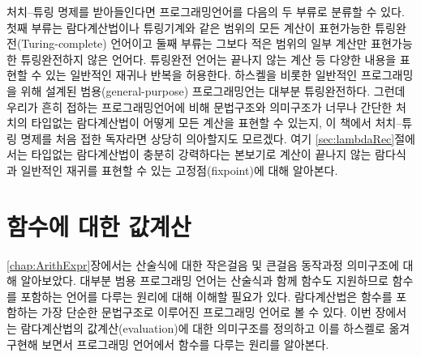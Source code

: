 처치--튜링 명제를 받아들인다면 프로그래밍언어를 다음의 두 부류로 분류할 수 있다.
첫째 부류는 람다계산법이나 튜링기계와 같은 범위의 모든 계산이 표현가능한 
튜링완전(Turing-complete) 언어이고 둘째 부류는 그보다 적은 범위의 일부 계산만
표현가능한 튜링완전하지 않은 언어다. 튜링완전 언어는 끝나지 않는 계산 등
다양한 내용을 표현할 수 있는 일반적인 재귀나 반복을 허용한다. 하스켈을 비롯한
일반적인 프로그래밍을 위해 설계된 범용(general-purpose) 프로그래밍언는 대부분
튜링완전하다. 그런데 우리가 흔히 접하는 프로그래밍언어에 비해 문법구조와
의미구조가 너무나 간단한 처치의 타입없는 람다계산법이 어떻게 모든 계산을
표현할 수 있는지, 이 책에서 처치--튜링 명제를 처음 접한 독자라면 상당히
의아할지도 모르겠다. 여기 \ref{sec:lambdaRec}절에서는 타입없는 람다계산법이 충분히 강력하다는
본보기로 계산이 끝나지 않는 람다식과 일반적인 재귀를 표현할 수 있는
고정점(fixpoint)에 대해 알아본다.




\chapter{함수에 대한 값계산}
\label{chap:FunEval}
\ref{chap:ArithExpr}장에서는 산술식에 대한 작은걸음 및 큰걸음
동작과정 의미구조에 대해 알아보았다. 대부분 범용 프로그래밍 언어는
산술식과 함께 함수도 지원하므로 함수를 포함하는 언어를
다루는 원리에 대해 이해할 필요가 있다. 람다계산법은 함수를 포함하는
가장 단순한 문법구조로 이루어진 프로그래밍 언어로 볼 수 있다. 
이번 장에서는 람다계산법의 값계산(evaluation)에 대한 의미구조를 정의하고
이를 하스켈로 옮겨 구현해 보면서
프로그래밍 언어에서 함수를 다루는 원리를 알아본다.
\newpage

